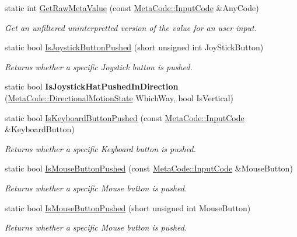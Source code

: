 \begin{DoxyCompactItemize}
static int \hyperlink{classMezzanine_1_1InputQueryTool_a19c32dc3e9bd02b7e5ea414ba34312b1}{GetRawMetaValue} (const \hyperlink{classMezzanine_1_1MetaCode_a3b5633f0145bf3287cf53a3f05b5563c}{MetaCode::InputCode} \&AnyCode)
\begin{DoxyCompactList}\small\item\em Get an unfiltered uninterpretted version of the value for an user input. \item\end{DoxyCompactList}\item 
static bool \hyperlink{classMezzanine_1_1InputQueryTool_a2f526d90e7dbeb04569037de562cf8d9}{IsJoystickButtonPushed} (short unsigned int JoyStickButton)
\begin{DoxyCompactList}\small\item\em Returns whether a specific Joystick button is pushed. \item\end{DoxyCompactList}\item 
\hypertarget{classMezzanine_1_1InputQueryTool_a4276e9278048e6d01df454dadd3fd4eb}{
static bool {\bfseries IsJoystickHatPushedInDirection} (\hyperlink{classMezzanine_1_1MetaCode_ad37143a88b8c94cb6b2f40f5d66104ad}{MetaCode::DirectionalMotionState} WhichWay, bool IsVertical)}
\label{classMezzanine_1_1InputQueryTool_a4276e9278048e6d01df454dadd3fd4eb}

\item 
static bool \hyperlink{classMezzanine_1_1InputQueryTool_a45df66eaaa0fb0da23c3c8b580a5d844}{IsKeyboardButtonPushed} (const \hyperlink{classMezzanine_1_1MetaCode_a3b5633f0145bf3287cf53a3f05b5563c}{MetaCode::InputCode} \&KeyboardButton)
\begin{DoxyCompactList}\small\item\em Returns whether a specific Keyboard button is pushed. \item\end{DoxyCompactList}\item 
static bool \hyperlink{classMezzanine_1_1InputQueryTool_a80827ec8a5705b2ee6cfc3f0d913e236}{IsMouseButtonPushed} (const \hyperlink{classMezzanine_1_1MetaCode_a3b5633f0145bf3287cf53a3f05b5563c}{MetaCode::InputCode} \&MouseButton)
\begin{DoxyCompactList}\small\item\em Returns whether a specific Mouse button is pushed. \item\end{DoxyCompactList}\item 
static bool \hyperlink{classMezzanine_1_1InputQueryTool_ac987ef5d3c7a6600be820d95a66f81e0}{IsMouseButtonPushed} (short unsigned int MouseButton)
\begin{DoxyCompactList}\small\item\em Returns whether a specific Mouse button is pushed. \item\end{DoxyCompactList}\end{DoxyCompactItemize}
